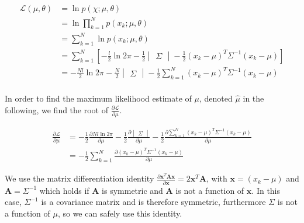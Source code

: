 \documentclass[a4paper, 10pt, twoside]{article}
\begin{document}
\begin{align*}
    \mathcal{L}(\mu, \theta)
     & = \ln p(\chi; \mu, \theta)                                                                                                               \\
     & = \ln \prod_{k=1}^N p(x_k; \mu, \theta)                                                                                                  \\
     & = \sum_{k=1}^N \ln p(x_k; \mu, \theta)                                                                                                   \\
     & = \sum_{k=1}^N \left[-\frac{l}{2} \ln 2\pi -\frac{1}{2} \begin{vmatrix} \Sigma \end{vmatrix} -\frac{1}{2} (x_k-\mu)^T \Sigma^{-1} (x_k-\mu)\right] \\
     & = -\frac{Nl}{2} \ln 2\pi -\frac{N}{2} \begin{vmatrix} \Sigma \end{vmatrix} -\frac{1}{2} \sum_{k=1}^N (x_k-\mu)^T \Sigma^{-1} (x_k-\mu)             \\
\end{align*}

In order to find the maximum likelihood estimate of $\mu$, denoted $\hat{\mu}$ in the following, we find the root of $\frac{\partial \mathcal{L}}{\partial \mu}$.

\begin{align*}
    \frac{\partial \mathcal{L}}{\partial \mu}
     & =
    -\frac{1}{2} \frac{\partial{Nl \ln 2\pi}}{\partial \mu}
    -\frac{1}{2} \frac{\partial \begin{vmatrix} \Sigma \end{vmatrix}}{\partial \mu}
    -\frac{1}{2} \frac{\partial \sum_{k=1}^N (x_k-\mu)^T \Sigma^{-1} (x_k-\mu)}{\partial \mu} \\
     & =
    -\frac{1}{2} \sum_{k=1}^N \frac{\partial (x_k-\mu)^T \Sigma^{-1} (x_k-\mu)}{\partial \mu}
\end{align*}

We use the matrix differentiation identity $\frac{\partial \mathbf{x}^T\mathbf{Ax}}{\partial \mathbf{x}} = 2\mathbf{x}^T\mathbf{A}$, with $\mathbf{x} = (x_k-\mu)$ and $\mathbf{A} = \Sigma^{-1}$ which holds if $\mathbf{A}$ is symmetric and $\mathbf{A}$ is not a function of $\mathbf{x}$. In this case, $\Sigma^{-1}$ is a covariance matrix and is therefore symmetric, furthermore $\Sigma$ is not a function of $\mu$, so we can safely use this identity.
\end{document}
